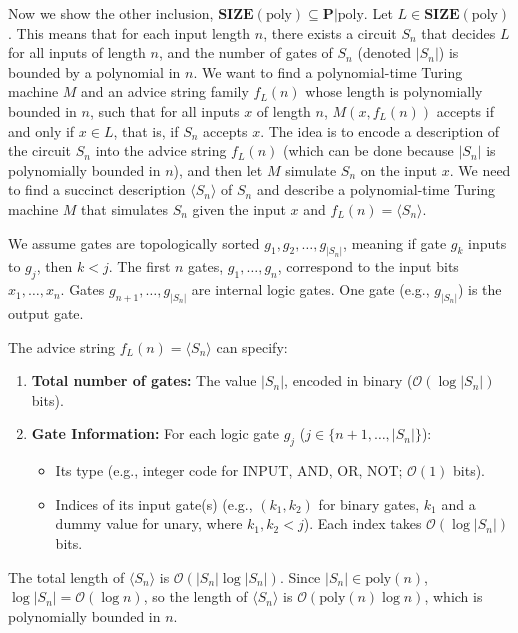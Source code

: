 \documentclass{amsart}
\theoremstyle{plain}
\theoremstyle{definition}
\newcommand{\size}[1]{\textbf{SIZE}(#1)}
\newcommand{\poly}{\text{poly}}
\newcommand{\advice}[2]{#1 | #2}
\newcommand{\p}{\textbf{P}}
\begin{document}
\begin{enumerate}[label=\textbf{Exercise \arabic*:}, leftmargin=0cm, labelwidth=-0.2cm, align=left]
        Now we show the other inclusion, $\size{\poly} \subseteq \advice{\p}{\poly}$.
        Let $L \in \size{\poly}$.
        This means that for each input length $n$, there exists a circuit $S_n$
        that decides $L$ for all inputs of length $n$, and the number of gates of $S_n$
        (denoted $|S_n|$) is bounded by a polynomial in $n$.
        We want to find a polynomial-time Turing machine $M$ and
        an advice string family $f_L(n)$ whose length is polynomially bounded in $n$,
        such that  for all inputs $x$ of length $n$,
        $M(x, f_L(n))$ accepts if and only if $x \in L$, that is, if $S_n$ accepts $x$.
        The idea is to encode a description of the circuit $S_n$ into the advice string
        $f_L(n)$ (which can be done because $|S_n|$ is polynomially bounded in $n$),
        and then let $M$ simulate $S_n$ on the input $x$.
        We need to find a succinct description $\langle S_n \rangle$ of $S_n$
        and describe a polynomial-time Turing machine $M$ that simulates $S_n$ given the input $x$ and $f_L(n) = \langle S_n \rangle$.

        We assume gates are topologically sorted $g_1, g_2, \dots, g_{|S_n|}$, meaning if gate $g_k$ inputs to $g_j$, then $k < j$.
        The first $n$ gates, $g_1, \dots, g_n$, correspond to the input bits $x_1, \dots, x_n$.
        Gates $g_{n+1}, \dots, g_{|S_n|}$ are internal logic gates.
        One gate (e.g., $g_{|S_n|}$) is the output gate.

        The advice string $f_L(n) = \langle S_n \rangle$ can specify:
        \begin{enumerate}
            \item \textbf{Total number of gates:} The value $|S_n|$, encoded in binary ($\mathcal{O}(\log |S_n|)$ bits).
            \item \textbf{Gate Information:} For each logic gate $g_j$ ($j \in \{n+1, \dots, |S_n|\}$):
            \begin{itemize}
                \item Its type (e.g., integer code for INPUT, AND, OR, NOT; $\mathcal{O}(1)$ bits).
                \item Indices of its input gate(s) (e.g., $(k_1, k_2)$ for binary gates, $k_1$ and a dummy value for unary, where $k_1, k_2 < j$).
                Each index takes $\mathcal{O}(\log |S_n|)$ bits.
            \end{itemize}
        \end{enumerate}
        The total length of $\langle S_n \rangle$ is $\mathcal{O}(|S_n| \log |S_n|)$.
        Since $|S_n| \in \poly(n)$, $\log |S_n| = \mathcal{O}(\log n)$,
        so the length of $\langle S_n \rangle$ is $\mathcal{O}(\poly(n) \log n)$, which is polynomially bounded in $n$.


\end{enumerate}
\end{document}
